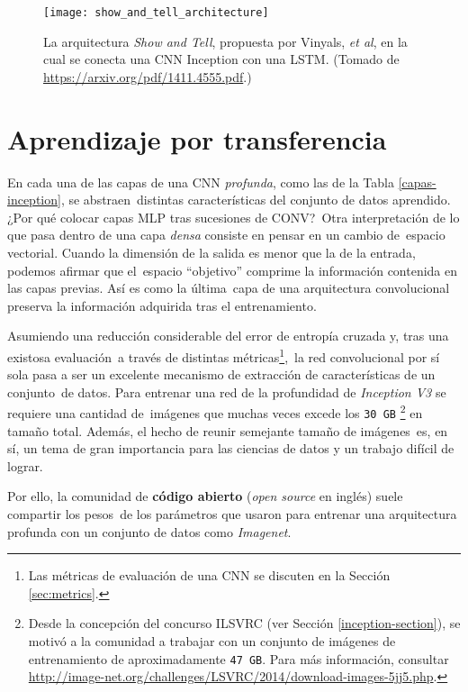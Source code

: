 \begin{figure}[H]
  \centering
  \texttt{[image: show\_and\_tell\_architecture]}
  \caption{La arquitectura \emph{Show and Tell}, propuesta por Vinyals, \emph{et al},\cite{DBLP:journals/corr/VinyalsTBE14}
    en la cual se conecta una CNN Inception con una LSTM.
    (Tomado de \url{https://arxiv.org/pdf/1411.4555.pdf}.)}
  \label{show_and_tell_architecture}
\end{figure}

\section{Aprendizaje por transferencia}

\noindent
En cada una de las capas de una CNN \emph{profunda}, como las de la Tabla \ref{capas-inception}, se abstraen\
distintas características del conjunto de datos aprendido. ¿Por qué colocar capas MLP tras sucesiones de CONV?\
Otra interpretación de lo que pasa dentro de una capa \emph{densa} consiste en pensar en un cambio de\
espacio vectorial. Cuando la dimensión de la salida es menor que la de la entrada, podemos afirmar que el\
espacio ``objetivo'' comprime la información contenida en las capas previas. Así es como la última\
capa de una arquitectura convolucional preserva la información adquirida tras el entrenamiento.\par
Asumiendo una reducción considerable del error de entropía cruzada y, tras una existosa evaluación\
a través de distintas métricas\footnote{
  Las métricas de evaluación de una CNN se discuten en la Sección \ref{sec:metrics}.
},\
la red convolucional por sí sola pasa a ser un excelente mecanismo de extracción de características de un conjunto\
de datos. Para entrenar una red de la profundidad de \emph{Inception V3} se requiere una cantidad de\
imágenes que muchas veces excede los \verb+30 GB+%
\footnote{
  Desde la concepción del concurso ILSVRC (ver Sección \ref{inception-section}), se motivó a la comunidad a trabajar
  con un conjunto de imágenes de entrenamiento de aproximadamente \texttt{47 GB}. Para más información, consultar
  \url{http://image-net.org/challenges/LSVRC/2014/download-images-5jj5.php}.
} en tamaño total. Además, el hecho de reunir semejante tamaño de imágenes\
es, en sí, un tema de gran importancia para las ciencias de datos y un trabajo difícil de lograr.\par
Por ello, la comunidad de \textbf{código abierto} (\emph{open source} en inglés) suele compartir los pesos\
de los parámetros que usaron para entrenar una arquitectura profunda con un conjunto de datos como \emph{Imagenet}.\par
